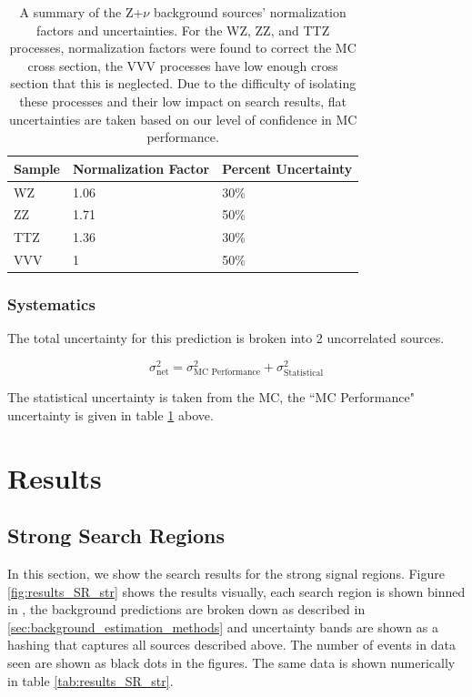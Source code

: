       \begin{table}[!h]
      \centering
      \caption{\label{tab:znu_norm_factors}
      A summary of the Z+$\nu$ background sources' normalization factors and uncertainties. For the WZ, ZZ, and TTZ processes, normalization factors were found to correct the MC cross section, the VVV processes have low enough cross section that this is neglected. Due to the difficulty of isolating these processes and their low impact on search results, flat uncertainties are taken based on our level of confidence in MC performance.
      }
      \begin{center}
        \begin{tabular} {l | l | l}
        \hline
        \hline
        Sample & Normalization Factor & Percent Uncertainty \\
        \hline
        WZ     & 1.06                 & 30\%                \\
        ZZ     & 1.71                 & 50\%                \\
        TTZ    & 1.36                 & 30\%                \\
        VVV    & 1                    & 50\%                \\
        \hline
        \hline
        \end{tabular}
      \end{center}
    \end{table}

  \subsubsection{Systematics}

      The total uncertainty for this prediction is broken into 2 uncorrelated sources.

      \[
        \sigma^2_{\text{net}} = \sigma^2_{\text{MC Performance}} + \sigma^2_{\text{Statistical}}
      \]

      The statistical uncertainty is taken from the MC, the ``MC Performance" uncertainty is given in table \ref{tab:znu_norm_factors} above.

\section{Results} \label{sec:results}
  \subsection{Strong Search Regions} \label{sec:strong_search_regions}
    In this section, we show the search results for the strong signal regions. Figure \ref{fig:results_SR_str} shows the results visually, each search region is shown binned in \MET, the background predictions are broken down as described in \ref{sec:background_estimation_methods} and uncertainty bands are shown as a hashing that captures all sources described above. The number of events in data seen are shown as black dots in the figures. The same data is shown numerically in table \ref{tab:results_SR_str}.

